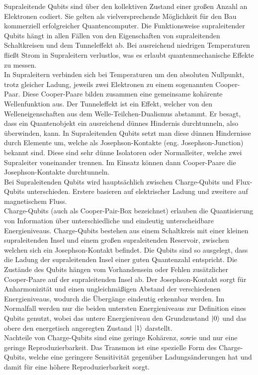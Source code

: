 Supraleitende Qubits sind über den kollektiven Zustand einer großen Anzahl an Elektronen codiert.
Sie gelten als vielversprechende Möglichkeit für den Bau kommerziell erfolgreicher Quantencomputer.
Die Funktionsweise supraleitender Qubits hängt in allen Fällen von den Eigenschaften von supraleitenden Schaltkreisen und dem Tunneleffekt ab. Bei ausreichend niedrigen Temperaturen fließt Strom in Supraleitern verlustlos, was es erlaubt quantenmechanische Effekte zu messen.\\

In Supraleitern verbinden sich bei Temperaturen um den absoluten Nullpunkt, trotz gleicher Ladung, jeweils zwei Elektronen zu einem sogenannten Cooper-Paar. Diese Cooper-Paare bilden zusammen eine gemeinsame kohärente Wellenfunktion aus.
Der Tunneleffekt ist ein Effekt, welcher von den Welleneigenschaften aus dem Welle-Teilchen-Dualismus abstammt.
Er besagt, dass ein Quantenobjekt ein ausreichend dünnes Hindernis durchtunneln, also überwinden, kann.
In Supraleitenden Qubits setzt man diese dünnen Hindernisse durch Elemente um, welche als Josephson-Kontakte (eng. Josephson-Junction) bekannt sind.
Diese sind sehr dünne Isolatoren oder Normalleiter, welche zwei Supraleiter voneinander trennen.
Im Einsatz können dann Cooper-Paare die Josephson-Kontakte durchtunneln.\\

Bei Supraleitenden Qubits wird hauptsächlich zwischen Charge-Qubits und Flux-Qubits unterschieden. Erstere basieren auf elektrischer Ladung und zweitere auf magnetischem Fluss.\\
Charge-Qubits (auch als Cooper-Pair-Box bezeichnet) erlauben die Quantisierung von Information über unterschiedliche und eindeutig unterscheidbare Energieniveaus. Charge-Qubits bestehen aus einem Schaltkreis mit einer kleinen supraleitenden Insel und einem großen supraleitenden Reservoir, zwischen welchen sich ein Josephson-Kontakt befindet.
Die Qubits sind so ausgelegt, dass die Ladung der supraleitenden Insel einer guten Quantenzahl entspricht. Die Zustände des Qubits hängen vom Vorhandensein oder Fehlen zusätzlicher Cooper-Paare auf der supraleitenden Insel ab.
Der Josephson-Kontakt sorgt für Anharmonizität und einen ungleichmäßigen Abstand der verschiedenen Energieniveaus, wodurch die Übergänge eindeutig erkennbar werden. Im Normalfall werden nur die beiden untersten Energieniveaus zur Definition eines Qubits genutzt, wobei das untere Energieniveau den Grundzustand $\ket0$ und das obere den energetisch angeregten Zustand $\ket1$ darstellt.\\
Nachteile von Charge-Qubits sind eine geringe Kohärenz, sowie und nur eine geringe Reproduzierbarkeit. Das Transmon ist eine spezielle Form des Charge-Qubits, welche eine geringere Sensitivität gegenüber Ladungsänderungen hat und damit für eine höhere Reproduzierbarkeit sorgt.\\ 

